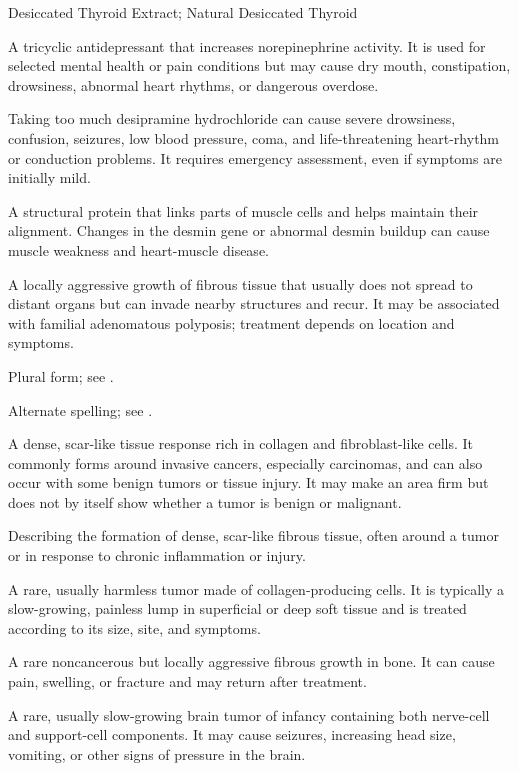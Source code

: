 \synonyms
Desiccated Thyroid Extract; Natural Desiccated Thyroid

 A tricyclic antidepressant that increases norepinephrine activity. It is used for selected mental health or pain conditions but may cause dry mouth, constipation, drowsiness, abnormal heart rhythms, or dangerous overdose.

 Taking too much desipramine hydrochloride can cause severe drowsiness, confusion, seizures, low blood pressure, coma, and life-threatening heart-rhythm or conduction problems. It requires emergency assessment, even if symptoms are initially mild.

 A structural protein that links parts of muscle cells and helps maintain their alignment. Changes in the desmin gene or abnormal desmin buildup can cause muscle weakness and heart-muscle disease.

 A locally aggressive growth of fibrous tissue that usually does not spread to distant organs but can invade nearby structures and recur. It may be associated with familial adenomatous polyposis; treatment depends on location and symptoms.

 Plural form; see .

 Alternate spelling; see .

 A dense, scar-like tissue response rich in collagen and fibroblast-like cells. It commonly forms around invasive cancers, especially carcinomas, and can also occur with some benign tumors or tissue injury. It may make an area firm but does not by itself show whether a tumor is benign or malignant.

 Describing the formation of dense, scar-like fibrous tissue, often around a tumor or in response to chronic inflammation or injury.

 A rare, usually harmless tumor made of collagen-producing cells. It is typically a slow-growing, painless lump in superficial or deep soft tissue and is treated according to its size, site, and symptoms.

 A rare noncancerous but locally aggressive fibrous growth in bone. It can cause pain, swelling, or fracture and may return after treatment.

 A rare, usually slow-growing brain tumor of infancy containing both nerve-cell and support-cell components. It may cause seizures, increasing head size, vomiting, or other signs of pressure in the brain.

